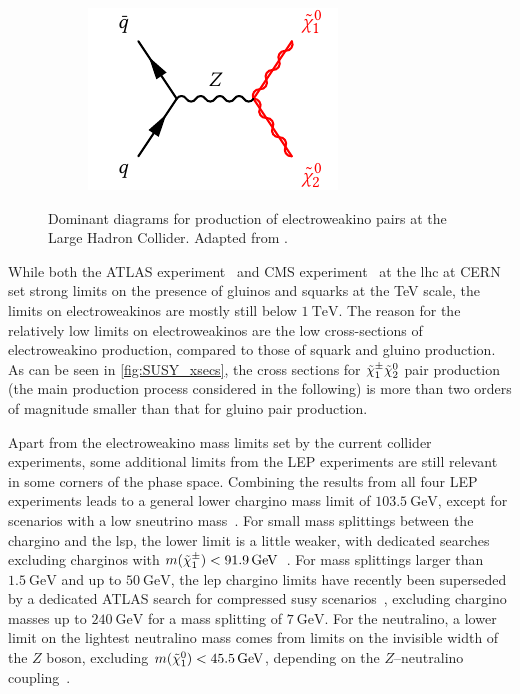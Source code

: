 \begin{figure}
\begin{subfigure}[b]{0.33\linewidth}
		\centering\includegraphics[width=.9\textwidth]{electroweakino_production_3}
		\caption{\label{fig:electroweakino_production_3}}
	\end{subfigure}	
	\caption{Dominant diagrams for production of electroweakino pairs at the Large Hadron Collider. Adapted from \cite{Martin:1997ns}.}\label{fig:electroweakino_production}
\end{figure}

While both the ATLAS experiment~\cite{ATL-PHYS-PUB-2021-007} and CMS experiment~\cite{CMSsummary} at the \gls{lhc} at CERN set strong limits on the presence of gluinos and squarks at the TeV scale, the limits on electroweakinos are mostly still below $\SI{1}{\TeV}$. 
The reason for the relatively low limits on electroweakinos are the low cross-sections of electroweakino production, compared to those of squark and gluino production.
As can be seen in \cref{fig:SUSY_xsecs}, the cross sections for $\tilde{\chi}_1^\pm\tilde{\chi}_2^0$ pair production (the main production process considered in the following) is more than two orders of magnitude smaller than that for gluino pair production.  

Apart from the electroweakino mass limits set by the current collider experiments, some additional limits from the LEP experiments are still relevant in some corners of the phase space. Combining the results from all four LEP experiments leads to a general lower chargino mass limit of $\SI{103.5}{\GeV}$, except for scenarios with a low sneutrino mass~\cite{lep_susy_results}. For small mass splittings between the chargino and the \gls{lsp}, the lower limit is a little weaker, with dedicated searches excluding charginos with $m(\charg) < \SI{91.9}{\GeV}$~\cite{lep_susy_results}. For mass splittings larger than $\SI{1.5}{\GeV}$ and up to $\SI{50}{\GeV}$, the \gls{lep} chargino limits have recently been superseded by a dedicated ATLAS search for compressed \gls{susy} scenarios~\cite{SUSY-2018-16}, excluding chargino masses up to $\SI{240}{\GeV}$ for a mass splitting of $\SI{7}{\GeV}$. For the neutralino, a lower limit on the lightest neutralino mass comes from limits on the invisible width of the $Z$ boson, excluding $m(\lsp) < \SI{45.5}{\GeV}$, depending on the $Z$--neutralino coupling~\cite{pdg2020}.

